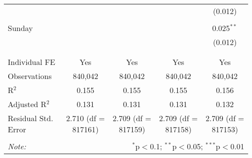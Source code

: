 \documentclass[
]{article}
\begin{document}
\begin{table}[!htbp]
{\begin{tabular}{@{\extracolsep{5pt}}lcccc}
  &  &  &  & (0.012) \\ 
  & & & & \\ 
 Sunday &  &  &  & 0.025$^{**}$ \\ 
  &  &  &  & (0.012) \\ 
  & & & & \\ 
\hline \\[-1.8ex] 
Individual FE & Yes & Yes & Yes & Yes \\ 
Observations & 840,042 & 840,042 & 840,042 & 840,042 \\ 
R$^{2}$ & 0.155 & 0.155 & 0.155 & 0.156 \\ 
Adjusted R$^{2}$ & 0.131 & 0.131 & 0.131 & 0.132 \\ 
Residual Std. Error & 2.710 (df = 817161) & 2.709 (df = 817159) & 2.709 (df = 817158) & 2.709 (df = 817153) \\ 
\hline 
\hline \\[-1.8ex] 
\textit{Note:}  & \multicolumn{4}{r}{$^{*}$p$<$0.1; $^{**}$p$<$0.05; $^{***}$p$<$0.01} \\ 
\end{tabular}
} 
\end{table} 
\newpage
\end{document}
